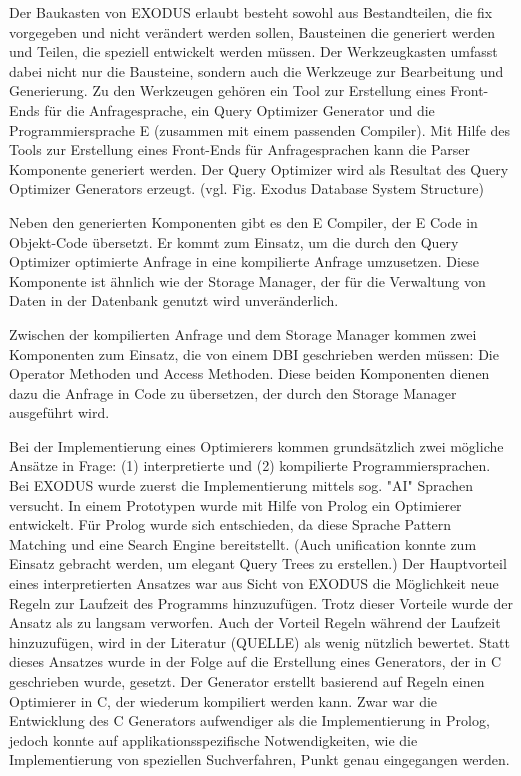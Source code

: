 Der Baukasten von EXODUS erlaubt       besteht sowohl aus Bestandteilen, die fix vorgegeben und nicht verändert werden sollen, Bausteinen die generiert werden und Teilen, die speziell entwickelt werden müssen. Der Werkzeugkasten umfasst dabei nicht nur die Bausteine, sondern auch die Werkzeuge zur Bearbeitung und Generierung. Zu den Werkzeugen gehören ein Tool zur Erstellung eines Front-Ends für die Anfragesprache, ein Query Optimizer Generator und die Programmiersprache E (zusammen mit einem passenden Compiler). Mit Hilfe des Tools zur Erstellung eines Front-Ends für Anfragesprachen kann die Parser Komponente generiert werden. Der Query Optimizer wird als Resultat des Query Optimizer Generators erzeugt. (vgl. Fig. Exodus Database System Structure)

Neben den generierten Komponenten gibt es den E Compiler, der E Code in Objekt-Code übersetzt. Er kommt zum Einsatz, um die durch den Query Optimizer optimierte Anfrage in eine kompilierte Anfrage umzusetzen. Diese Komponente ist ähnlich wie der Storage Manager, der für die Verwaltung von Daten in der Datenbank genutzt wird unveränderlich. 

Zwischen der kompilierten Anfrage und dem Storage Manager kommen zwei Komponenten zum Einsatz, die von einem DBI geschrieben werden müssen: Die Operator Methoden und Access Methoden. Diese beiden Komponenten dienen dazu die Anfrage in Code zu übersetzen, der durch den  Storage Manager ausgeführt wird.

Bei der Implementierung eines Optimierers kommen grundsätzlich zwei mögliche Ansätze in Frage: (1) interpretierte und (2) kompilierte Programmiersprachen. Bei EXODUS wurde zuerst die Implementierung mittels sog. "AI" Sprachen versucht. In einem Prototypen wurde mit Hilfe von Prolog ein Optimierer entwickelt. Für Prolog wurde sich entschieden, da diese Sprache Pattern Matching und eine Search Engine bereitstellt. (Auch unification konnte zum Einsatz gebracht werden, um elegant Query Trees zu erstellen.) Der Hauptvorteil eines interpretierten Ansatzes war aus Sicht von EXODUS die Möglichkeit neue Regeln zur Laufzeit des Programms hinzuzufügen. Trotz dieser Vorteile wurde der Ansatz als zu langsam verworfen. Auch der Vorteil Regeln während der Laufzeit hinzuzufügen, wird in der Literatur (QUELLE) als wenig nützlich bewertet. Statt dieses Ansatzes wurde in der Folge auf die Erstellung eines Generators, der in C geschrieben wurde, gesetzt. Der Generator erstellt basierend auf Regeln einen Optimierer in C, der wiederum kompiliert werden kann. Zwar war die Entwicklung des C Generators aufwendiger als die Implementierung in Prolog, jedoch konnte auf applikationsspezifische Notwendigkeiten, wie die Implementierung von speziellen Suchverfahren, Punkt genau eingegangen werden.


